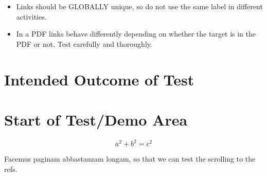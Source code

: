 \documentclass{ximera}
\begin{document}
\begin{remark}

    \begin{itemize}
        \item  Links should be GLOBALLY unique, so do not use the same label in different activities.
        \item  In a PDF links behave differently depending on whether the target is in the PDF or not. 
            Test carefully and thoroughly.
    \end{itemize}
\end{remark}


\section{Intended Outcome of Test}


\section{Start of Test/Demo Area}

\begin{equation}
a^2 + b^2 = c^2    \label{eq:pyth}
\end{equation}

Facemus paginam abbastanzam longam, so that we can test the scrolling to the refs.

\lipsum[1]

\lipsum[2]

\lipsum[3]

\lipsum[4]

\hrulefill
\end{document}
